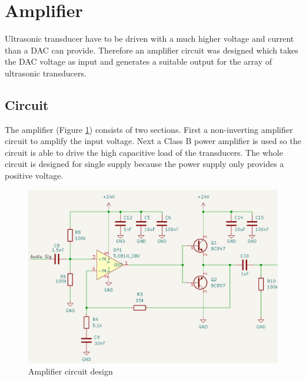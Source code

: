 \section{Amplifier}\label{sec:pcb:amp}


Ultrasonic transducer have to be driven with a much higher voltage and current than a DAC can provide. Therefore an amplifier circuit was designed which takes the DAC voltage as input and generates a suitable output for the array of ultrasonic transducers.

\subsection{Circuit}

The amplifier (Figure \ref{fig:pcb:amp_circuit}) consists of two sections. First a non-inverting amplifier circuit to amplify the input voltage. Next a Class B power amplifier is used so the circuit is able to drive the high capacitive load of the transducers. The whole circuit is designed for single supply because the power supply only provides a positive voltage.

\begin{figure}
  \centering
  \includegraphics[height=\largeheight]{src/assets/pictures/circuit/amp_circuit.png}
  \caption{Amplifier circuit design}\label{fig:pcb:amp_circuit}
\end{figure}

